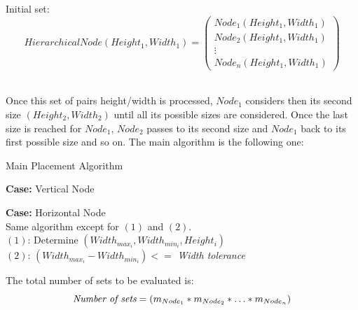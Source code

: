 \begin{algorithm}
Initial set:\\
\begin{equation}
  HierarchicalNode (Height_1, Width_1) = 
  \begin{pmatrix}
    Node_1(Height_1, Width_1)  \\
    Node_2(Height_1, Width_1)  \\
    \vdots            \\
    Node_n(Height_1, Width_1)  
  \end{pmatrix}
\end{equation}\\
\end{algorithm}
\vspace{-0.5cm}

Once this set of pairs height/width is processed, $Node_1$ considers then its second size $(Height_2, Width_2)$ until all its possible sizes are considered. Once the last size is reached for $Node_1$, $Node_2$ passes to its second size and $Node_1$ back to its first possible size and so on. The main algorithm is the following one:

\begin{algorithm}
\caption{Main Placement Algorithm}
{\bf Case:} Vertical Node \\
\vspace{0.25cm}

{\bf Case:} Horizontal Node \\
Same algorithm except for $(1)$ and $(2)$.\\
$(1)$: Determine $(Width_{max_i}, Width_{min_i}, Height_{i})$\\
$(2)$: $(Width_{max_i} - Width_{min_i}) <=$ \textit{Width tolerance}\vspace{0.25cm}
\end{algorithm}
\newpage
The total number of sets to be evaluated is: 
\vspace{-0.25cm}
\begin{equation}
\textit{Number of sets} =  (m_{Node_1} * m_{Node_2} * \hdots * m_{Node_n})\\
\end{equation}

